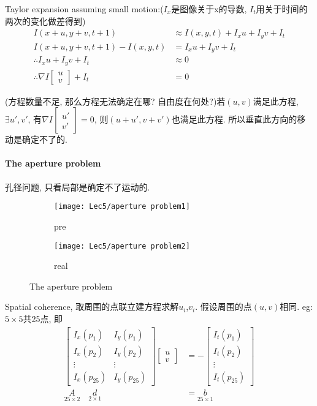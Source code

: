 Taylor expansion assuming small motion:($I_x$是图像关于x的导数, $I_t$用关于时间的两次的变化做差得到)
\begin{align*}
    I(x+u,y+v,t+1)&\approx I(x,y,t)+I_xu+I_yv+I_t\\
    I(x+u,y+v,t+1)-I(x,y,t)&=I_xu+I_yv+I_t\\
    \therefore I_xu+I_yv+I_t&\approx 0\\
    \therefore \nabla I \begin{bmatrix}u\\v\end{bmatrix}+I_t&=0
\end{align*}

(方程数量不足, 那么方程无法确定在哪? 自由度在何处?)若$(u,v)$满足此方程, $\exists u',v'$, 有$\nabla I \begin{bmatrix}u'\\v'\end{bmatrix}=0$, 则$(u+u',v+v')$也满足此方程. 所以垂直此方向的移动是确定不了的.

\paragraph{The aperture problem} 孔径问题, 只看局部是确定不了运动的. 

\begin{figure}[H]
    \centering
    \begin{subfigure}{0.38\textwidth}
        \centering
        \texttt{[image: Lec5/aperture problem1]}
        \caption{pre}
    \end{subfigure}
    \begin{subfigure}{0.38\textwidth}
        \centering
        \texttt{[image: Lec5/aperture problem2]}
        \caption{real}
    \end{subfigure}
    \caption{The aperture problem}
\end{figure}

Spatial coherence, 取周围的点联立建方程求解$u_i$,$v_i$. 假设周围的点$(u,v)$相同. eg:$5\times 5$共25点, 即
\begin{align*}
    \begin{bmatrix}
        I_x(p_1)& I_y(p_1)\\
        I_x(p_2)& I_y(p_2)\\
        \vdots & \vdots \\
        I_x(p_{25})& I_y(p_{25})
    \end{bmatrix}\begin{bmatrix}
        u\\v
    \end{bmatrix}&=-\begin{bmatrix}
        I_t(p_1)\\
        I_t(p_2)\\
        \vdots\\
        I_t(p_{25})
    \end{bmatrix}\\
    \underset{25\times 2}{A} \quad \underset{2\times 1}{d}&=\underset{25\times 1}{b}
\end{align*}

